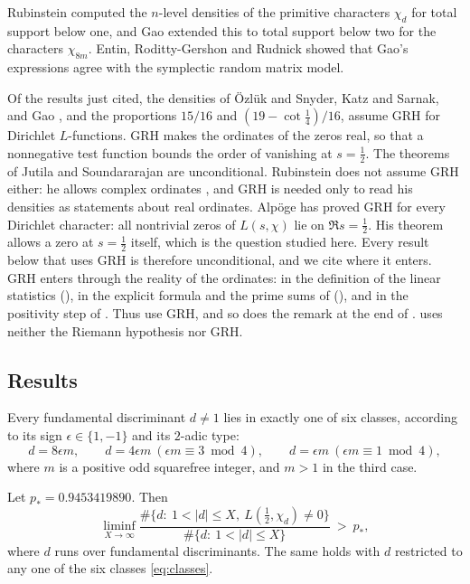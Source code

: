 \documentclass[11pt,colorlinks]{charlie}
\newcommand{\pstar}{p_\ast}
\begin{document}
Rubinstein \cite{Rub} computed the $n$-level densities of the primitive characters $\chi_d$ for total support below one, and Gao \cite{Gao} extended this to total support below two for the characters $\chi_{8m}$. Entin, Roditty-Gershon and Rudnick \cite{ERR} showed that Gao's expressions agree with the symplectic random matrix model.

Of the results just cited, the densities of \"Ozl\"uk and Snyder, Katz and Sarnak, and Gao \cite[\S2]{Gao}, and the proportions $15/16$ and $(19-\cot\tfrac14)/16$, assume GRH for Dirichlet $L$-functions. GRH makes the ordinates of the zeros real, so that a nonnegative test function bounds the order of vanishing at $s=\tfrac12$. The theorems of Jutila and Soundararajan are unconditional. Rubinstein does not assume GRH either: he allows complex ordinates \cite[before Theorem~3.1]{Rub}, and GRH is needed only to read his densities as statements about real ordinates. Alp\"oge \cite{Alpoge} has proved GRH for every Dirichlet character: all nontrivial zeros of $L(s,\chi)$ lie on $\Re s=\tfrac12$. His theorem allows a zero at $s=\tfrac12$ itself, which is the question studied here. Every result below that uses GRH is therefore unconditional, and we cite \cite{Alpoge} where it enters. GRH enters through the reality of the ordinates: in the definition of the linear statistics (), in the explicit formula and the prime sums of  (), and in the positivity step of . Thus  use GRH, and so does the remark at the end of .  uses neither the Riemann hypothesis nor GRH.

\subsection{Results}
Every fundamental discriminant $d\neq1$ lies in exactly one of six classes, according to its sign $\epsilon\in\{1,-1\}$ and its $2$-adic type:
\begin{equation}\label{eq:classes}
 d=8\epsilon m,\qquad d=4\epsilon m\ (\epsilon m\equiv3\bmod 4),\qquad d=\epsilon m\ (\epsilon m\equiv1\bmod4),
\end{equation}
where $m$ is a positive odd squarefree integer, and $m>1$ in the third case.

\begin{theorem}\label{thm:main}
Let $\pstar=0.9453419890$. Then
\[
 \liminf_{X\to\infty}\frac{\#\{d:\ 1<|d|\le X,\ L(\tfrac12,\chi_d)\neq0\}}{\#\{d:\ 1<|d|\le X\}}\ >\ \pstar,
\]
where $d$ runs over fundamental discriminants. The same holds with $d$ restricted to any one of the six classes \eqref{eq:classes}.
\end{theorem}
\end{document}
